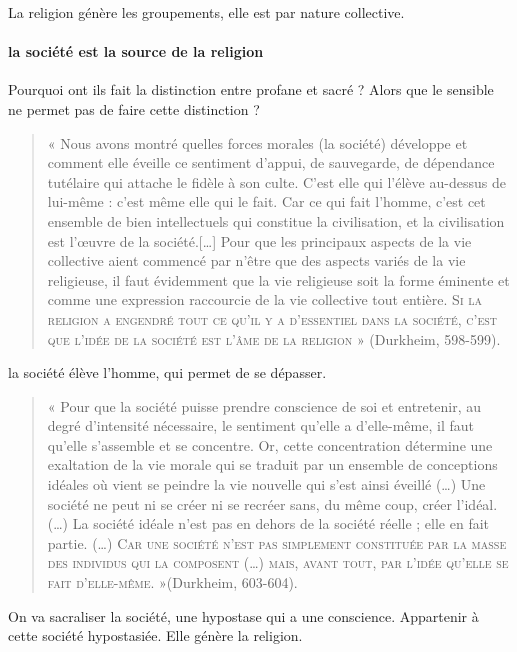 La religion génère les groupements, elle est par nature collective.


\paragraph{la société est la source de la religion} Pourquoi ont ils fait la distinction entre profane et sacré ? Alors que le sensible ne permet pas de faire cette distinction ?

\begin{quote}
    « Nous avons montré quelles forces morales (la société) développe et comment elle éveille ce sentiment d’appui, de sauvegarde, de dépendance tutélaire qui attache le fidèle à son culte. C’est elle qui l’élève au-dessus de lui-même : c’est même elle qui le fait. Car ce qui fait l’homme, c’est cet ensemble de bien intellectuels qui constitue la civilisation, et la civilisation est l’œuvre de la société.[…] Pour que les principaux aspects de la vie collective aient commencé par n’être que des aspects variés de la vie religieuse, il faut évidemment que la vie religieuse soit la forme éminente et comme une expression raccourcie de la vie collective tout entière. \textsc{Si la religion a engendré tout ce qu’il y a d’essentiel dans la société, c’est que l’idée de la société est l’âme de la religion} » (Durkheim, 598-599). 
\end{quote}

\begin{Synthesis}
la société élève l'homme, qui permet de se dépasser. 
\end{Synthesis}



\begin{quote}
    « Pour que la société puisse prendre conscience de soi et entretenir, au degré d’intensité nécessaire, le sentiment qu’elle a d’elle-même, il faut qu’elle s’assemble et se concentre. Or, cette concentration détermine une exaltation de la vie morale qui se traduit par un ensemble de conceptions idéales où vient se peindre la vie nouvelle qui s’est ainsi éveillé (…) Une société ne peut ni se créer ni se recréer sans, du même coup, créer l’idéal. (…) La société idéale n’est pas en dehors de la société réelle ; elle en fait partie. (…)\textsc{ Car une société n’est pas simplement constituée par la masse des individus qui la composent (…) mais, avant tout, par l’idée qu’elle se fait d’elle-même.} »(Durkheim, 603-604). 
\end{quote}

\begin{Def}[Religion]
On va sacraliser la société, une hypostase qui a une conscience.  Appartenir à cette société hypostasiée. Elle génère la religion. 
\end{Def}

